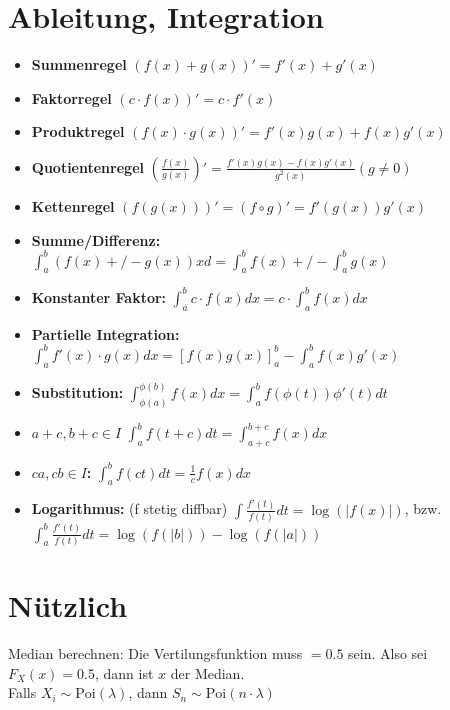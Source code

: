 \section{Ableitung, Integration}

\begin{itemize}
 	\item \textbf{Summenregel} $(f(x)+g(x))' = f'(x) + g'(x)$
    \item \textbf{Faktorregel} $(c\cdot f(x))' = c\cdot f'(x)$
    \item \textbf{Produktregel} $(f(x)\cdot g(x))' = f'(x)g(x) + f(x)g'(x)$
    \item \textbf{Quotientenregel} $\left(\frac{f(x)}{g(x)}\right)' = \frac{f'(x)g(x) - f(x)g'(x)}{g^2(x)}(g\neq 0)$
    \item \textbf{Kettenregel} $(f(g(x)))' = (f\circ g)' = f'(g(x))g'(x)$
\end{itemize}

\begin{itemize}
  \item \textbf{Summe/Differenz:} $\int_a^b (f(x) +/- g(x)) xd = \int_a^b f(x) +/- \int_a^b g(x)$
  \item \textbf{Konstanter Faktor:} $\int_a^b c\cdot f(x)dx = c\cdot \int_a^b f(x)dx$
  \item \textbf{Partielle Integration:} $\int_a^b f'(x)\cdot g(x)dx = \left[f(x)g(x)\right]_a^b - \int_a^b f(x)g'(x)$
  \item \textbf{Substitution:} $\int_{\phi(a)}^{\phi(b)} f(x)dx = \int_a^b f(\phi(t))\phi '(t) dt$
  \item \textbf{$a+c, b+c \in I$} $\int_a^b f(t+c)dt = \int_{a+c}^{b+c} f(x)dx$
  \item \textbf{$ca,cb\in I$: } $\int_a^b f(ct)dt = \frac{1}{c}f(x)dx$
  \item \textbf{Logarithmus: }\;(f stetig diffbar) $\int\frac{f'(t)}{f(t)}dt = \log(|f(x)|)$, bzw. $\int_a^b\frac{f'(t)}{f(t)}dt = \log(f(|b|)) - \log(f(|a|))$
\end{itemize}

\section{Nützlich}

Median berechnen: Die Vertilungsfunktion muss $= 0.5$ sein. Also sei $F_X(x) = 0.5$, dann ist $x$ der Median.\\

Falls $X_i \sim \text{Poi}(\lambda)$, dann $S_n \sim \text{Poi}(n \cdot \lambda)$
\\

